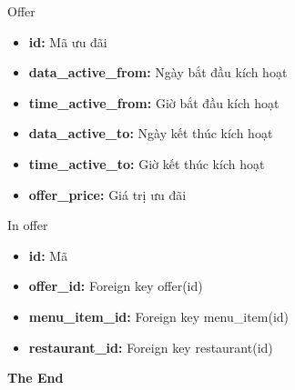 \documentclass[aspectratio=43,xcolor=dvipsnames]{beamer}
\begin{document}
	\begin{frame}{Offer}
		\begin{itemize}
			\item \textbf{id: } Mã ưu đãi
			\item \textbf{data\_active\_from:} Ngày bắt đầu kích hoạt
			\item \textbf{time\_active\_from:} Giờ bắt đầu kích hoạt
			\item \textbf{data\_active\_to:} Ngày kết thúc kích hoạt
			\item \textbf{time\_active\_to:} Giờ kết thúc kích hoạt
			\item \textbf{offer\_price:} Giá trị ưu đãi
		\end{itemize}
	\end{frame}
	\begin{frame}{In offer}
		\begin{itemize}
			\item \textbf{id: } Mã
			\item \textbf{offer\_id: } Foreign key offer(id)
			\item \textbf{menu\_item\_id: } Foreign key menu\_item(id)
			\item \textbf{restaurant\_id: } Foreign key restaurant(id)
		\end{itemize}
	\end{frame}

	
	
	\begin{frame}
		\Huge{\centerline{\textbf{The End}}}
	\end{frame}
	
	
\end{document}
